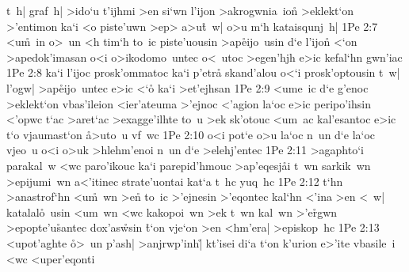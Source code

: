 t~h|
graf~h|
>ido`u
t'ijhmi
>en
si`wn
l'ijon
>akrogwnia~ion\r{}
>eklekt`on
>'entimon
ka`i
<o
piste'uwn
>ep>
a>u\r{t}~w|
o>u
m`h
kataisqunj~h|\bibvsend
\vs 1Pe 2:7
<u\r{m}~in
o>~un
<h
tim`h
to~ic
piste'uousin
>ap\r{e}ijo~usin
d`e
l'ijo\r{n}
<`on
>apedok'imasan
o<i
o>ikodomo~untec
o<~utoc
>egen'hjh
e>ic
kefal`hn
gwn'iac\bibvsend
\vs 1Pe 2:8
ka`i
l'ijoc
prosk'ommatoc
ka`i
p'etr\r{a}
skand'alou
o<`i
prosk'optousin
t~w|
l'ogw|
>ap\r{e}ijo~untec
e>ic
<`o\r{}
ka`i
>et'ejhsan\bibvsend
\vs 1Pe 2:9
<ume~ic
d`e
g'enoc
>eklekt`on
vbas'ileion
<ier'ateuma
>'ejnoc
<'agion
la`oc
e>ic
peripo'ihsin
<'opwc
t`ac
>aret`ac
>exagge'ilhte
to~u
>ek
sk'otouc
<um~ac
kal'esantoc
e>ic
t`o
vjaumast`on
\r{a}>uto~u
vf~wc\bibvsend
\vs 1Pe 2:10
o<i
pot`e
o>u
la`oc
n~un
d`e
la`oc
vjeo~u
o<i
o>uk
>hlehm'enoi
n~un
d`e
>elehj'entec\bibvsend
\vs 1Pe 2:11
>agaphto`i
parakal~w
<wc
paro'ikouc
ka`i
parepid'hmouc
>ap'eqesj\r{a}i
t~wn
sarkik~wn
>epijumi~wn
a<'itinec
strate'uontai
kat`a
t~hc
yuq~hc\bibvsend
\vs 1Pe 2:12
t`hn
>anastrof`hn
<u\r{m}~wn
>en\r{}
to~ic
>'ejnesin
>'eqontec
kal`hn
<'ina
>en
<~w|
katalal\r{o}~usin
<um~wn
<wc
kakopoi~wn
>ek
t~wn
kal~wn
>'e\r{r}gwn
>epopte'u\r{s}antec
dox'as\r{w}sin
\r{t}`on
vje`on
>en
<hm'era|
>episkop~hc\bibvsend
\vs 1Pe 2:13
<upot'aghte
\r{o}>~un
p'ash|
>anjrwp'inh|\r{}
kt'isei
di`a
t`on
k'urion
e>'ite
vbasile~i
<wc
<uper'eqonti\bibvsend
